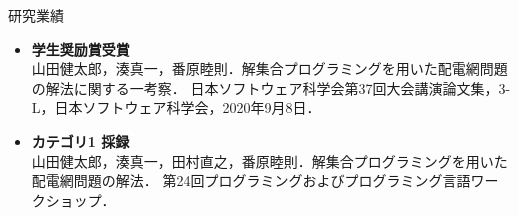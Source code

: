 \documentclass[dvipdfmx,11pt]{beamer}
\begin{document}
\begin{frame}{研究業績}
 \begin{itemize}
  \small
  \item \alert{\bf 学生奨励賞受賞}\\
        山田健太郎，湊真一，番原睦則．解集合プログラミングを用いた配電網問題の解法に関する一考察．
        日本ソフトウェア科学会第37回大会講演論文集，3-L，日本ソフトウェア科学会，2020年9月8日．
  \item \alert{\bf カテゴリ1 採録}\\
        山田健太郎，湊真一，田村直之，番原睦則．解集合プログラミングを用いた配電網問題の解法．
        第24回プログラミングおよびプログラミング言語ワークショップ．
 \end{itemize}
\end{frame}

%
\end{document}
